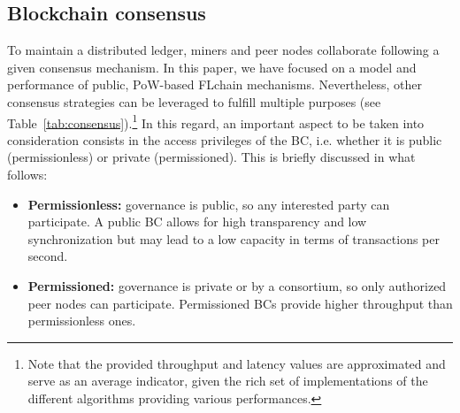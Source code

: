 \documentclass[10pt,journal,compsoc]{IEEEtran}
\begin{document}
\subsection{Blockchain consensus}
\label{section:consensus}
To maintain a distributed ledger, miners and peer nodes collaborate following a given consensus mechanism. In this paper, we have focused on a model and performance of public, PoW-based FLchain mechanisms. Nevertheless, other consensus strategies can be leveraged to fulfill multiple purposes (see Table~\ref{tab:consensus}).\footnote{Note that the provided throughput and latency values are approximated and serve as an average indicator, given the rich set of implementations of the different algorithms providing various performances.} In this regard, an important aspect to be taken into consideration consists in the access privileges of the BC, i.e. whether it is public (permissionless) or private (permissioned). This is briefly discussed in what follows:
\begin{itemize}
	\item \textbf{Permissionless:} governance is public, so any interested party can participate. A public BC allows for high transparency and low synchronization but may lead to a low capacity in terms of transactions per second.
	\item \textbf{Permissioned:} governance is private or by a consortium, so only authorized peer nodes can participate. Permissioned BCs provide higher throughput than permissionless ones.
\end{itemize}

\end{document}
